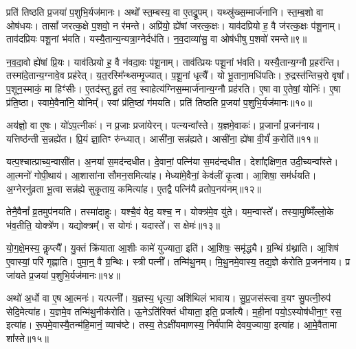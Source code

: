 प्रति॑ तिष्ठति प्र॒जया॑ प॒शुभि॒र्यज॑मानः।
अथो᳚ स्त॒म्बस्य॒ वा ए॒तद्रू॒पम्।
यथ्स्रु॑ख्स॒म्मार्ज॑नानि।
स्त॒म्ब॒शो वा ओष॑धयः।
तासां᳚ जरत्क॒क्षे प॒शवो॒ न र॑मन्ते।
अप्रि॑यो॒ ह्ये॑षां जरत्क॒क्षः।
याव॑दप्रियो ह॒ वै ज॑रत्क॒क्षः प॑शू॒नाम्।
ताव॑दप्रियः पशू॒नां भ॑वति।
यस्यै॒तान्य॒न्यत्रा॒ग्नेर्दध॑ति।
न॒व॒दाव्या॑सु॒ वा ओष॑धीषु प॒शवो॑ रमन्ते॥९॥

न॒व॒दा॒वो ह्ये॑षां प्रि॒यः।
याव॑त्प्रियो ह॒ वै न॑वदा॒वः प॑शू॒नाम्।
ताव॑त्प्रियः पशू॒नां भ॑वति।
यस्यै॒तान्य॒ग्नौ प्र॒हर॑न्ति।
तस्मा॑दे॒तान्य॒ग्नावे॒व प्रह॑रेत्।
य॒त॒रस्मि᳚न्थ्सम्मृ॒ज्यात्।
प॒शू॒नां धृत्यै᳚।
यो भू॒ताना॒मधि॑पतिः।
रु॒द्रस्त॑न्तिच॒रो वृषा᳚।
प॒शून॒स्माकं॒ मा हिꣳ॑सीः।
ए॒तद॑स्तु हु॒तं तव॒ स्वाहेत्य॑ग्निस॒म्मार्ज॑नान्य॒ग्नौ प्रह॑रति।
ए॒षा वा ए॒तेषां॒ योनिः॑।
ए॒षा प्र॑ति॒ष्ठा।
स्वामे॒वैना॑नि॒ योनिम्᳚।
स्वां प्र॑ति॒ष्ठां ग॑मयति।
प्रति॑ तिष्ठति प्र॒जया॑ प॒शुभि॒र्यज॑मानः॥१०॥

अय॑ज्ञो॒ वा ए॒षः।
यो॑ऽप॒त्नीकः॑।
न प्र॒जाः प्रजा॑येरन्।
पत्न्यन्वा᳚स्ते।
य॒ज्ञमे॒वाकः॑।
प्र॒जानां᳚ प्र॒जन॑नाय।
यत्तिष्ठ॑न्ती स॒न्नह्ये॑त।
प्रि॒यं ज्ञा॒तिꣳ रु॑न्ध्यात्।
आसी॑ना॒ सन्न॑ह्यते।
आसी॑ना॒ ह्ये॑षा वी॒र्यं॑ क॒रोति॑॥११॥

यत्प॒श्चात्प्राच्य॒न्वासी॑त।
अ॒नया॑ स॒मद॑न्दधीत।
दे॒वानां॒ पत्नि॑या स॒मद॑न्दधीत।
देशा᳚द्दक्षिण॒त उदी॒च्यन्वा᳚स्ते।
आ॒त्मनो॑ गोपी॒थाय॑।
आ॒शासा॑ना सौमन॒समित्या॑ह।
मेध्या॑मे॒वैनां॒ केव॑लीं कृ॒त्वा।
आ॒शिषा॒ सम॑र्धयति।
अ॒ग्नेरनु॑\-व्रता भू॒त्वा सन्न॑ह्ये सुकृ॒ताय॒ कमित्या॑ह।
ए॒तद्वै पत्नि॑यै व्रतोप॒नय॑नम्॥१२॥

तेनै॒वैनां᳚ व्र॒तमुप॑नयति।
तस्मा॑दाहुः।
यश्चै॒वं वेद॒ यश्च॒ न।
योक्त्र॑मे॒व यु॑ते।
यम॒न्वास्ते᳚।
तस्या॒मुष्मिँ॑ल्लो॒के भ॑व॒तीति॒ योक्त्रे॑ण।
यद्योक्त्रम्᳚।
स योगः॑।
यदास्ते᳚।
स क्षेमः॑॥१३॥

यो॒ग॒क्षे॒मस्य॒ कॢप्त्यै᳚।
यु॒क्तं क्रि॑याता आ॒शीः कामे॑ युज्याता॒ इति॑।
आ॒शिषः॒ समृ॑द्ध्यै।
ग्र॒न्थिं ग्र॑थ्नाति।
आ॒शिष॑ ए॒वास्यां॒ परि॑ गृह्णाति।
पुमा॒न्॒ वै ग्र॒न्थिः।
स्त्री पत्नी᳚।
तन्मि॑थु॒नम्।
मि॒थु॒नमे॒वास्य॒ तद्य॒ज्ञे क॑रोति प्र॒जन॑नाय।
प्र जा॑यते प्र॒जया॑ प॒शुभि॒र्यज॑मानः॥१४॥

अथो॑ अ॒र्धो वा ए॒ष आ॒त्मनः॑।
यत्पत्नी᳚।
य॒ज्ञस्य॒ धृत्या॒ अशि॑थिलं भावाय।
सु॒प्र॒जस॑स्त्वा व॒यꣳ सु॒पत्नी॒रुप॑ सेदि॒मेत्या॑ह।
य॒ज्ञमे॒व तन्मि॑थु॒नीक॑रोति।
ऊ॒नेऽति॑रिक्तं धीयाता॒ इति॒ प्रजा᳚त्यै।
म॒ही॒नां पयो॒\-ऽस्योष॑धीना॒ꣳ॒ रस॒ इत्या॑ह।
रू॒पमे॒वास्यै॒तन्म॑हि॒मानं॒ व्याच॑ष्टे।
तस्य॒ तेऽक्षी॑यमाणस्य॒ निर्व॑पामि देवय॒ज्याया॒ इत्या॑ह।
आ॒\-मे॒वैतामा शा᳚स्ते॥१५॥\anuvakamend[क॒रोति॑ व्रतोप॒नय॑नं॒ क्षेमो॒ यज॑मानः शास्ते]

